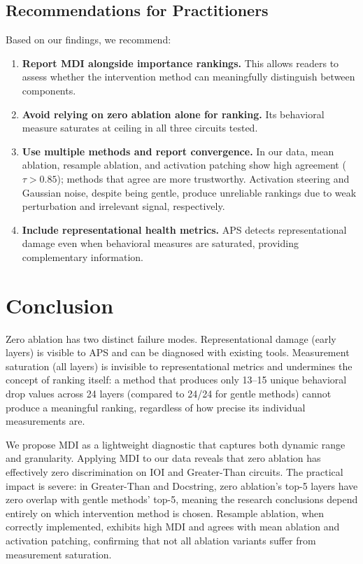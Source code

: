 \documentclass[pdflatex,sn-mathphys-num]{sn-jnl}
\begin{document}
\subsection{Recommendations for Practitioners}

Based on our findings, we recommend:

\begin{enumerate}
    \item \textbf{Report MDI alongside importance rankings.} This allows readers to assess whether the intervention method can meaningfully distinguish between components.
    \item \textbf{Avoid relying on zero ablation alone for ranking.} Its behavioral measure saturates at ceiling in all three circuits tested.
    \item \textbf{Use multiple methods and report convergence.} In our data, mean ablation, resample ablation, and activation patching show high agreement ($\tau > 0.85$); methods that agree are more trustworthy. Activation steering and Gaussian noise, despite being gentle, produce unreliable rankings due to weak perturbation and irrelevant signal, respectively.
    \item \textbf{Include representational health metrics.} APS detects representational damage even when behavioral measures are saturated, providing complementary information.
\end{enumerate}

\section{Conclusion}

Zero ablation has two distinct failure modes. Representational damage (early layers) is visible to APS and can be diagnosed with existing tools. Measurement saturation (all layers) is invisible to representational metrics and undermines the concept of ranking itself: a method that produces only 13--15 unique behavioral drop values across 24 layers (compared to 24/24 for gentle methods) cannot produce a meaningful ranking, regardless of how precise its individual measurements are.

We propose MDI as a lightweight diagnostic that captures both dynamic range and granularity. Applying MDI to our data reveals that zero ablation has effectively zero discrimination on IOI and Greater-Than circuits. The practical impact is severe: in Greater-Than and Docstring, zero ablation's top-5 layers have zero overlap with gentle methods' top-5, meaning the research conclusions depend entirely on which intervention method is chosen. Resample ablation, when correctly implemented, exhibits high MDI and agrees with mean ablation and activation patching, confirming that not all ablation variants suffer from measurement saturation.
\end{document}
